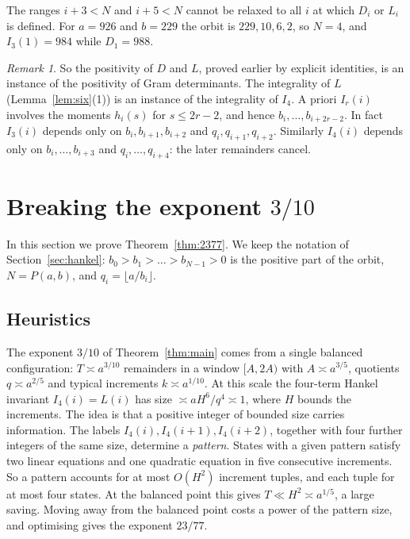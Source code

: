 \documentclass[11pt]{amsart}
\theoremstyle{definition}
\theoremstyle{remark}
\newtheorem{remark}[theorem]{Remark}
\begin{document}
The ranges $i+3<N$ and $i+5<N$ cannot be relaxed to all $i$ at which $D_i$ or $L_i$ is defined.
For $a=926$ and $b=229$ the orbit is $229,10,6,2$, so $N=4$, and $I_3(1)=984$ while $D_1=988$.

\begin{remark}
So the positivity of $D$ and $L$, proved earlier by explicit identities, is an instance of the
positivity of Gram determinants. The integrality of $L$ (Lemma~\ref{lem:six}(1)) is an instance
of the integrality of $I_4$. A priori $I_r(i)$ involves the moments $h_i(s)$ for $s\le2r-2$,
and hence $b_i,\dots,b_{i+2r-2}$. In fact $I_3(i)$ depends only on $b_i,b_{i+1},b_{i+2}$ and
$q_i,q_{i+1},q_{i+2}$. Similarly $I_4(i)$ depends only on $b_i,\dots,b_{i+3}$ and
$q_i,\dots,q_{i+4}$: the later remainders cancel.
\end{remark}

\section{Breaking the exponent \texorpdfstring{$3/10$}{3/10}}\label{sec:2377}

In this section we prove Theorem~\ref{thm:2377}. We keep the notation of
Section~\ref{sec:hankel}: $b_0>b_1>\dots>b_{N-1}>0$ is the positive part of the orbit,
$N=P(a,b)$, and $q_i=\lfloor a/b_i\rfloor$.

\subsection{Heuristics}
The exponent $3/10$ of Theorem~\ref{thm:main} comes from a single balanced configuration:
$T\asymp a^{3/10}$ remainders in a window $[A,2A)$ with $A\asymp a^{3/5}$, quotients
$q\asymp a^{2/5}$ and typical increments $k\asymp a^{1/10}$. At this scale the four-term Hankel
invariant $I_4(i)=L(i)$ has size $\asymp aH^6/q^4\asymp 1$, where $H$ bounds the increments.
The idea is that a positive integer of bounded size carries information. The labels
$I_4(i),I_4(i+1),I_4(i+2)$, together with four further integers of the same size, determine a
\emph{pattern}. States with a given pattern satisfy two linear equations and one quadratic
equation in five consecutive increments. So a pattern accounts for at most $O(H^2)$
increment tuples, and each tuple for at most four states. At the balanced point this
gives $T\ll H^2\asymp a^{1/5}$, a large saving. Moving away from the balanced point costs a
power of the pattern size, and optimising gives the exponent $23/77$.
\end{document}
